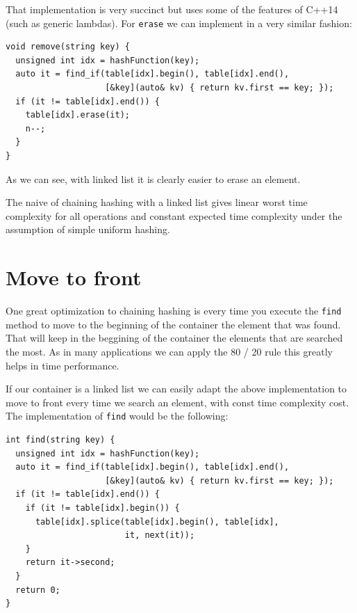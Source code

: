 That implementation is very succinct but uses some of the features of C++14 (such as generic lambdas). For \texttt{erase} we can implement in a very similar fashion:

\begin{lstlisting}
void remove(string key) {
  unsigned int idx = hashFunction(key);
  auto it = find_if(table[idx].begin(), table[idx].end(),
                    [&key](auto& kv) { return kv.first == key; });
  if (it != table[idx].end()) {
    table[idx].erase(it);
    n--;
  }
}
\end{lstlisting}

As we can see, with linked list it is clearly easier to erase an element. 

The naive of chaining hashing with a linked list gives linear worst time complexity for all operations and constant expected time complexity under the assumption of simple uniform hashing. 



\section{Move to front}

One great optimization to chaining hashing is every time you execute the \texttt{find} method to move to the beginning of the container the element that was found. That will keep in the beggining of the container the elements that are searched the most. As in many applications we can apply the 80 / 20 rule this greatly helps in time performance.

If our container is a linked list we can easily adapt the above implementation to move to front every time we search an element, with const time complexity cost. The implementation of \texttt{find} would be the following:

\begin{lstlisting}
int find(string key) {
  unsigned int idx = hashFunction(key);
  auto it = find_if(table[idx].begin(), table[idx].end(),
                    [&key](auto& kv) { return kv.first == key; });
  if (it != table[idx].end()) {
    if (it != table[idx].begin()) {
      table[idx].splice(table[idx].begin(), table[idx],
                        it, next(it));
    }
    return it->second;
  }
  return 0;
}
\end{lstlisting}

